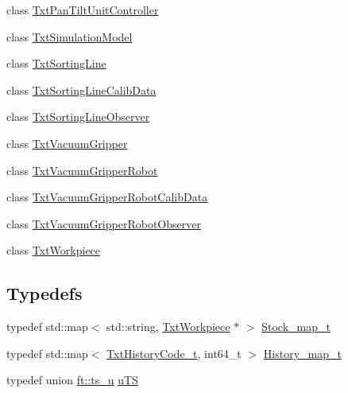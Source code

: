 \begin{DoxyCompactItemize}
\item 
class \hyperlink{classft_1_1_txt_pan_tilt_unit_controller}{Txt\+Pan\+Tilt\+Unit\+Controller}
\item 
class \hyperlink{classft_1_1_txt_simulation_model}{Txt\+Simulation\+Model}
\item 
class \hyperlink{classft_1_1_txt_sorting_line}{Txt\+Sorting\+Line}
\item 
class \hyperlink{classft_1_1_txt_sorting_line_calib_data}{Txt\+Sorting\+Line\+Calib\+Data}
\item 
class \hyperlink{classft_1_1_txt_sorting_line_observer}{Txt\+Sorting\+Line\+Observer}
\item 
class \hyperlink{classft_1_1_txt_vacuum_gripper}{Txt\+Vacuum\+Gripper}
\item 
class \hyperlink{classft_1_1_txt_vacuum_gripper_robot}{Txt\+Vacuum\+Gripper\+Robot}
\item 
class \hyperlink{classft_1_1_txt_vacuum_gripper_robot_calib_data}{Txt\+Vacuum\+Gripper\+Robot\+Calib\+Data}
\item 
class \hyperlink{classft_1_1_txt_vacuum_gripper_robot_observer}{Txt\+Vacuum\+Gripper\+Robot\+Observer}
\item 
class \hyperlink{classft_1_1_txt_workpiece}{Txt\+Workpiece}
\end{DoxyCompactItemize}
\subsection*{Typedefs}
\begin{DoxyCompactItemize}
\item 
typedef std\+::map$<$ std\+::string, \hyperlink{classft_1_1_txt_workpiece}{Txt\+Workpiece} $\ast$ $>$ \hyperlink{namespaceft_a3d5e802a7d78dac37b288630c9b21e64}{Stock\+\_\+map\+\_\+t}
\item 
typedef std\+::map$<$ \hyperlink{namespaceft_a159b26268d167d1a15cca7e324a25abf}{Txt\+History\+Code\+\_\+t}, int64\+\_\+t $>$ \hyperlink{namespaceft_aa7740d5a5a633c96d2063e7fd135cf89}{History\+\_\+map\+\_\+t}
\item 
typedef union \hyperlink{unionft_1_1ts__u}{ft\+::ts\+\_\+u} \hyperlink{namespaceft_a6b29d191a4ff3cd5738bcb38e4392811}{u\+TS}
\end{DoxyCompactItemize}
